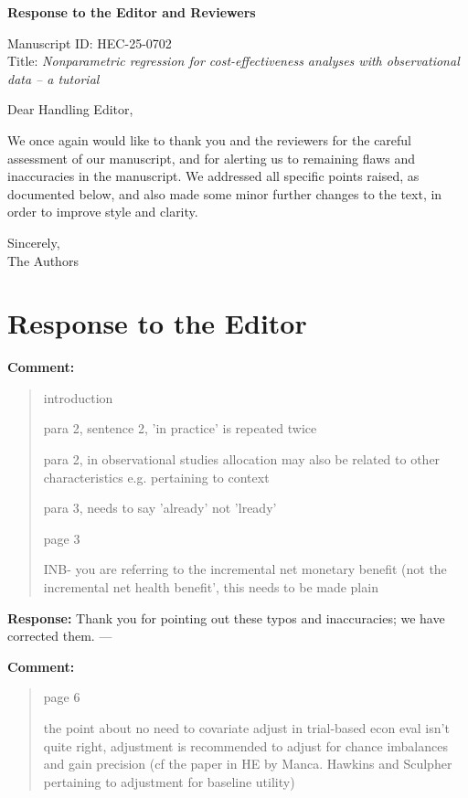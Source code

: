 \documentclass[11pt]{article}
\begin{document}
\begin{center}
{\Large\bf Response to the Editor and Reviewers}

\vspace{1em}

Manuscript ID: HEC-25-0702 \\
Title: \emph{Nonparametric regression for cost-effectiveness analyses with observational data – a tutorial}
\end{center}

\vspace{1em}

Dear Handling Editor,

We once again would like to thank you and the reviewers for the careful assessment of our manuscript, and for alerting us to remaining flaws and inaccuracies in the manuscript. We addressed all specific points raised, as documented below, and also made some minor further changes to the text, in order to improve style and clarity.

Sincerely,\\
The Authors

\section*{Response to the Editor}

\textbf{Comment:}  
\begin{quote}
introduction

para 2, sentence 2, 'in practice' is repeated twice

para 2, in observational studies allocation may also be related to other characteristics e.g. pertaining to context

para 3, needs to say 'already' not 'lready'

page 3

INB- you are referring to the incremental net monetary benefit (not the incremental net health benefit', this needs to be made plain
\end{quote}

\textbf{Response:}  
Thank you for pointing out these typos and inaccuracies; we have corrected them.
---

\textbf{Comment:}  
\begin{quote}
page 6

the point about no need to covariate adjust in trial-based econ eval isn't quite right, adjustment is recommended to adjust for chance imbalances and gain precision (cf the paper in HE by Manca. Hawkins and Sculpher pertaining to adjustment for baseline utility)
\end{quote}
\end{document}
